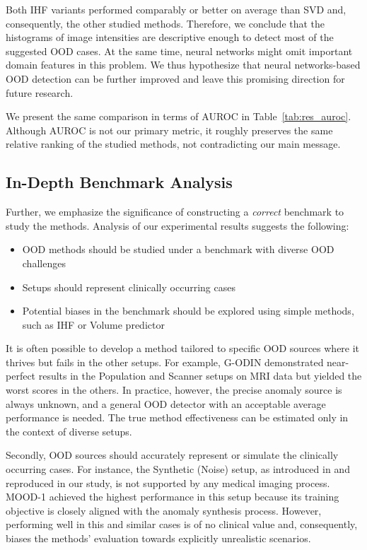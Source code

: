 Both IHF variants performed comparably or better on average than SVD and, consequently, the other studied methods. Therefore, we conclude that the histograms of image intensities are descriptive enough to detect most of the suggested OOD cases. At the same time, neural networks might omit important domain features in this problem. We thus hypothesize that neural networks-based OOD detection can be further improved and leave this promising direction for future research.

We present the same comparison in terms of AUROC in Table~\ref{tab:res_auroc}. Although AUROC is not our primary metric, it roughly preserves the same relative ranking of the studied methods, not contradicting our main message.




\subsection{In-Depth Benchmark Analysis}

Further, we emphasize the significance of constructing a \textit{correct} benchmark to study the methods. Analysis of our experimental results suggests the following:

\begin{itemize}	
	\item OOD methods should be studied under a benchmark with diverse OOD challenges
	\item Setups should represent clinically occurring cases
	\item Potential biases in the benchmark should be explored using simple methods, such as IHF or Volume predictor
\end{itemize}

It is often possible to develop a method tailored to specific OOD sources where it thrives but fails in the other setups. For example, G-ODIN demonstrated near-perfect results in the Population and Scanner setups on MRI data but yielded the worst scores in the others. In practice, however, the precise anomaly source is always unknown, and a general OOD detector with an acceptable average performance is needed. The true method effectiveness can be estimated only in the context of diverse setups.

Secondly, OOD sources should accurately represent or simulate the clinically occurring cases. For instance, the Synthetic (Noise) setup, as introduced in \cite{zimmerer2022mood} and reproduced in our study, is not supported by any medical imaging process. MOOD-1 achieved the highest performance in this setup because its training objective is closely aligned with the anomaly synthesis process. However, performing well in this and similar cases is of no clinical value and, consequently, biases the methods' evaluation towards explicitly unrealistic scenarios.

